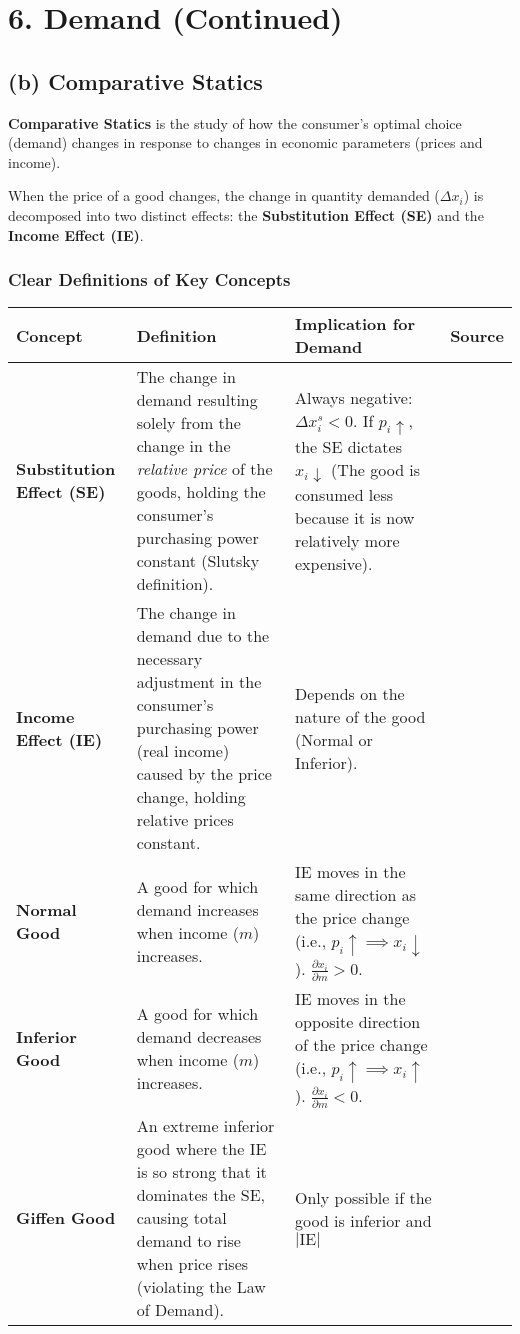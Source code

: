 \documentclass{article}
\begin{document}
\vspace{1em}
\hrulefill

\section{6. Demand (Continued)}
\subsection{(b) Comparative Statics}

\textbf{Comparative Statics} is the study of how the consumer's optimal choice (demand) changes in response to changes in economic parameters (prices and income).

When the price of a good changes, the change in quantity demanded ($\Delta x_i$) is decomposed into two distinct effects: the \textbf{Substitution Effect (SE)} and the \textbf{Income Effect (IE)}.

\subsubsection*{Clear Definitions of Key Concepts}

\begin{tabular*}{\textwidth}{@{\extracolsep{\fill}} l p{} p{} l}
\toprule
\textbf{Concept} & \textbf{Definition} & \textbf{Implication for Demand} & \textbf{Source} \\
\midrule
\textbf{Substitution Effect (SE)} & The change in demand resulting solely from the change in the \textit{relative price} of the goods, holding the consumer's purchasing power constant (Slutsky definition). & Always negative: $\Delta x_i^s < 0$. If $p_i \uparrow$, the SE dictates $x_i \downarrow$ (The good is consumed less because it is now relatively more expensive). & \\
\addlinespace
\textbf{Income Effect (IE)} & The change in demand due to the necessary adjustment in the consumer’s purchasing power (real income) caused by the price change, holding relative prices constant. & Depends on the nature of the good (Normal or Inferior). & \\
\addlinespace
\textbf{Normal Good} & A good for which demand increases when income ($m$) increases. & IE moves in the same direction as the price change (i.e., $p_i \uparrow \implies x_i \downarrow$). $\frac{\partial x_i}{\partial m} > 0$. & \\
\addlinespace
\textbf{Inferior Good} & A good for which demand decreases when income ($m$) increases. & IE moves in the opposite direction of the price change (i.e., $p_i \uparrow \implies x_i \uparrow$). $\frac{\partial x_i}{\partial m} < 0$. & \\
\addlinespace
\textbf{Giffen Good} & An extreme inferior good where the IE is so strong that it dominates the SE, causing total demand to rise when price rises (violating the Law of Demand). & Only possible if the good is inferior and $| \text{IE}|$ & \\
\bottomrule
\end{tabular*}
\end{document}
